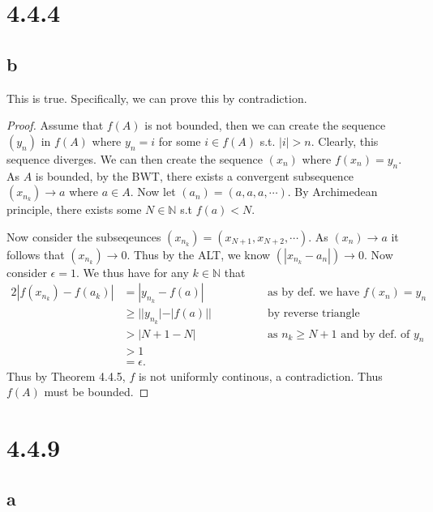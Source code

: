 \documentclass[10pt]{article}
\begin{document}
\section*{4.4.4}
\subsection*{b}

This is true. Specifically, we can prove this by contradiction. 

\begin{proof}
    Assume that $f(A)$ is not bounded, then we can create the sequence $(y_n)$ in $f(A)$ where $y_n=i$ for some $i\in f(A)$ s.t. $|i|> n.$
    Clearly, this sequence diverges. We can then create the sequence $(x_n)$ where $f(x_n)=y_n.$ As $A$ is bounded, by the BWT, there exists a convergent subsequence $(x_{n_k})\to a$ where $a\in A.$ Now let $(a_n) = (a,a,a,\cdots).$ 
    By Archimedean principle, there exists some $N\in\mathbb{N}$ s.t $f(a)< N.$ 
    
    Now consider the subseqeunces $(x_{n_k})=(x_{N+1},x_{N+2},\cdots).$ As $(x_n)\to a$ it follows that $(x_{n_k})\to 0$. Thus by the ALT, we know $(|x_{n_k}-a_n|)\to0.$ Now consider $\epsilon = 1.$ We thus have for any $k \in\mathbb{N}$ that
    \begin{alignat*}{2}
        |f(x_{n_k})-f(a_k)|&=|y_{n_k} - f(a)| \qquad\qquad&&\text{as by def. we have }f(x_n)=y_n\\
        &\ge ||y_{n_k}|-|f(a)|| &&\text{by reverse triangle inequality}\\
        &> |N+1 - N| &&\text{as }n_k\ge N+1\text{ and by def. of }y_n\\
        &> 1\\
        &=\epsilon.
    \end{alignat*}
     Thus by Theorem 4.4.5, $f$ is not uniformly continous, a contradiction. Thus $f(A)$ must be bounded.
\end{proof}

\section*{4.4.9}

\subsection*{a}
\end{document}
